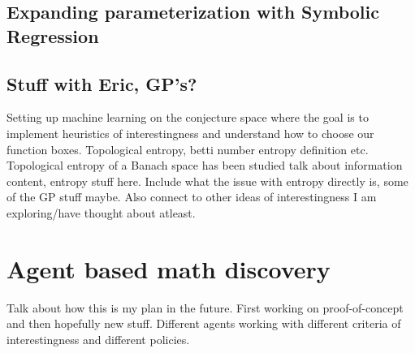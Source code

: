 \begin{itemize}
\end{itemize}
 

\subsection{Expanding parameterization with Symbolic Regression}
\subsection{Stuff with Eric, GP's?}
Setting up machine learning on the conjecture space where the goal is to implement heuristics of interestingness and understand how to choose our function boxes.
Topological entropy, betti number entropy definition etc. Topological entropy of a Banach space has been studied \cite{bobokTopologicalEntropyBanach2011}
talk about information content, entropy stuff here. Include what the issue with entropy directly is, some of the GP stuff maybe. Also connect to other ideas of interestingness I am exploring/have thought about atleast.

\section{Agent based math discovery}
Talk about how this is my plan in the future. First working on proof-of-concept and then hopefully new stuff.
Different agents working with different criteria of interestingness and different policies.
